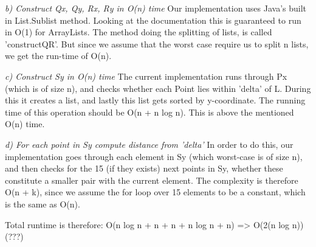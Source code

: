\documentclass{tufte-handout}
\begin{document}
\emph{b) Construct Qx, Qy, Rx, Ry in O(n) time } \linebreak
Our implementation uses Java's built in List.Sublist method. Looking at the documentation this is guaranteed to run in O(1) for ArrayLists. 
The method doing the splitting of lists, is called 'constructQR'. But since we assume that the worst case require us to split n lists,
we get the run-time of O(n).

\bigskip
\emph{c) Construct Sy in O(n) time} \linebreak
The current implementation runs through Px (which is of size n), and checks whether each Point lies within 'delta' of L. During this it 
creates a list, and lastly this list gets sorted by y-coordinate. The running time of this operation should be O(n + n log n). 
This is above the mentioned O(n) time. 

\bigskip
\emph{d) For each point in Sy compute distance from 'delta'} \linebreak
In order to do this, our implementation goes through each element in Sy (which worst-case is of size n), 
and then checks for the 15 (if they exists) next points in Sy, whether these constitute a smaller pair with the current element. 
The complexity is therefore O(n + k), since we assume the for loop over 15 elements to be a constant, which is the same as O(n).

\bigskip
Total runtime is therefore: O(n log n + n + n + n log n + n) => O(2(n log n)) (???)
\end{document}
